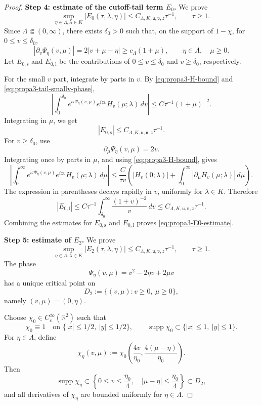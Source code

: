 \documentclass[10pt]{article}
\numberwithin{equation}{section}
\numberwithin{theorem}{section}
\begin{document}
\begin{appendix}
\begin{proof}
\medskip
\noindent\textbf{Step 4: estimate of the cutoff-tail term \(E_0\).}
We prove
\begin{equation}
\label{eq:propa3-E0-estimate}
\sup_{\eta\in\Lambda,\lambda\in K}
|E_0(\tau,\lambda,\eta)|
\le
C_{\Lambda,K,\mathfrak u,\mathfrak v,z}\tau^{-1},
\qquad \tau\ge1.
\end{equation}
Since \(\Lambda\Subset(0,\infty)\), there exists
\(\delta_0>0\) such that, on the support of \(1-\chi\), for \(0\le v\le\delta_0\),
\begin{equation}
\label{eq:propa3-tail-smallv-phase}
|\partial_v\Psi_\eta(v,\mu)|
=
2|v+\mu-\eta|
\ge
c_\Lambda(1+\mu),
\qquad \eta\in\Lambda,\quad \mu\ge0.
\end{equation}
Let \(E_{0,\mathrm{s}}\) and \(E_{0,\mathrm{l}}\) be the contributions of
\(0\le v\le\delta_0\) and \(v\ge\delta_0\), respectively.

For the small \(v\) part, integrate by parts in \(v\). By
\eqref{eq:propa3-H-bound} and \eqref{eq:propa3-tail-smallv-phase},
\[
\left|
\int_0^{\delta_0}
e^{i\tau\Psi_\eta(v,\mu)}
e^{izv}H_v(\mu;\lambda)\,dv
\right|
\le
C\tau^{-1}(1+\mu)^{-2}.
\]
Integrating in \(\mu\), we get
\[
|E_{0,\mathrm{s}}|
\le
C_{\Lambda,K,\mathfrak u,\mathfrak v,z}\tau^{-1}.
\]
For \(v\ge\delta_0\), use
\[
\partial_\mu\Psi_\eta(v,\mu)=2v.
\]
Integrating once by parts in \(\mu\), and using \eqref{eq:propa3-H-bound}, gives
\[
\left|
\int_0^\infty
e^{i\tau\Psi_\eta(v,\mu)}
e^{izv}H_v(\mu;\lambda)\,d\mu
\right|
\le
\frac{C}{\tau v}
\left(
|H_v(0;\lambda)|
+
\int_0^\infty |\partial_\mu H_v(\mu;\lambda)|\,d\mu
\right).
\]
The expression in parentheses decays rapidly in \(v\), uniformly for \(\lambda\in K\).
Therefore
\[
|E_{0,\mathrm{l}}|
\le
C\tau^{-1}
\int_{\delta_0}^\infty
\frac{(1+v)^{-2}}{v}\,dv
\le
C_{\Lambda,K,\mathfrak u,\mathfrak v,z}\tau^{-1}.
\]
Combining the estimates for \(E_{0,\mathrm{s}}\) and \(E_{0,\mathrm{l}}\) proves
\eqref{eq:propa3-E0-estimate}.

\medskip
\noindent\textbf{Step 5: estimate of \(E_2\).}
We prove
\begin{equation}
\label{eq:propa3-E2-estimate}
\sup_{\eta\in\Lambda,\lambda\in K}
|E_2(\tau,\lambda,\eta)|
\le
C_{\Lambda,K,\mathfrak u,\mathfrak v,z}\tau^{-1},
\qquad \tau\ge1.
\end{equation}
The phase
\[
\Psi_\eta(v,\mu)=v^2-2\eta v+2\mu v
\]
has a unique critical point on
\[
D_2:=\{(v,\mu):v\ge0,\ \mu\ge0\},
\]
namely \((v,\mu)=(0,\eta)\).

Choose \(\chi_0\in C_c^\infty(\mathbb R^2)\) such that
\[
\chi_0\equiv1\quad\text{on }\{|x|\le1/2,\ |y|\le1/2\},
\qquad
\operatorname{supp}\chi_0\subset\{|x|\le1,\ |y|\le1\}.
\]
For \(\eta\in\Lambda\), define
\[
\chi_\eta(v,\mu)
:=
\chi_0\left(\frac{4v}{\eta_0},\frac{4(\mu-\eta)}{\eta_0}\right).
\]
Then
\[
\operatorname{supp}\chi_\eta
\subset
\left\{
0\le v\le\frac{\eta_0}{4},
\quad
|\mu-\eta|\le\frac{\eta_0}{4}
\right\}
\subset D_2,
\]
and all derivatives of \(\chi_\eta\) are bounded uniformly for \(\eta\in\Lambda\).


\end{proof}
\end{appendix}
\end{document}
